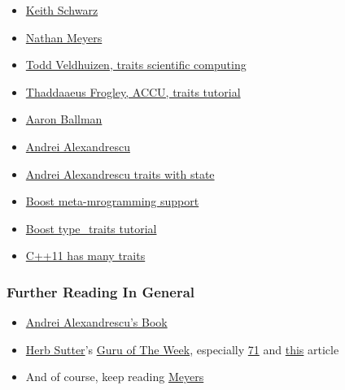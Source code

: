 \begin{itemize}
\itemsep1pt\parskip0pt
\item
  \href{http://www.keithschwarz.com/talks/slides/tmp-cs242.pdf}{Keith
  Schwarz}
\item
  \href{http://www.cantrip.org/traits.html}{Nathan Meyers}
\item
  \href{http://www.cs.rpi.edu/~musser/design/blitz/traits.html}{Todd
  Veldhuizen, traits scientific computing}
\item
  \href{http://accu.org/index.php/journals/442}{Thaddaaeus Frogley,
  ACCU, traits tutorial}
\item
  \href{http://blog.aaronballman.com/2011/11/a-simple-introduction-to-type-traits}{Aaron
  Ballman}
\item
  \href{http://erdani.com/publications/traits.html}{Andrei Alexandrescu}
\item
  \href{http://erdani.com/publications/traits_on_steroids.html}{Andrei
  Alexandrescu traits with state}
\item
  \href{http://www.boost.org/doc/libs/?view=category_Metaprogramming}{Boost
  meta-mrogramming support}
\item
  \href{http://www.boost.org/doc/libs/1_57_0/libs/type_traits/doc/html/boost_typetraits/background.html}{Boost
  type\_traits tutorial}
\item
  \href{http://www.cplusplus.com/reference/type_traits}{C++11 has many
  traits}
\end{itemize}

\subsubsection{Further Reading In
General}\label{further-reading-in-general}

\begin{itemize}
\itemsep1pt\parskip0pt
\item
  \href{http://www.amazon.co.uk/Modern-Design-Generic-Programming-Patterns/dp/0201704315/ref=sr_1_1?ie=UTF8\&qid=1421739179\&sr=8-1\&keywords=andrei+alexandrescu}{Andrei
  Alexandrescu's Book}
\item
  \href{http://herbsutter.com}{Herb Sutter}'s
  \href{http://www.gotw.ca/gotw}{Guru of The Week}, especially
  \href{http://www.gotw.ca/gotw/071.htm}{71} and
  \href{http://www.gotw.ca/publications/mxc++-item-4.htm}{this} article
\item
  And of course, keep reading
  \href{http://www.aristeia.com/books.html}{Meyers}
\end{itemize}

